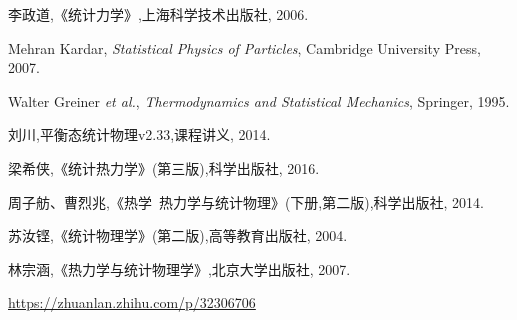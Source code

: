 \documentclass[UTF8,oneside,openany]{ctexbook}
\begin{document}
\begin{thebibliography}{99}
	
	李政道,《统计力学》,上海科学技术出版社, 2006.
	
	Mehran Kardar, \emph{Statistical Physics of Particles}, Cambridge University Press, 2007.
	
	Walter Greiner \emph{et al.}, \emph{Thermodynamics and Statistical Mechanics}, Springer, 1995.
	
	刘川,平衡态统计物理v2.33,课程讲义, 2014.
	
	梁希侠,《统计热力学》(第三版),科学出版社, 2016.
	
	周子舫、曹烈兆,《热学\ 热力学与统计物理》(下册,第二版),科学出版社, 2014.
	
	苏汝铿,《统计物理学》(第二版),高等教育出版社, 2004.
	
	林宗涵,《热力学与统计物理学》,北京大学出版社, 2007.
	
	\url{https://zhuanlan.zhihu.com/p/32306706}
\end{thebibliography}
\end{document}
